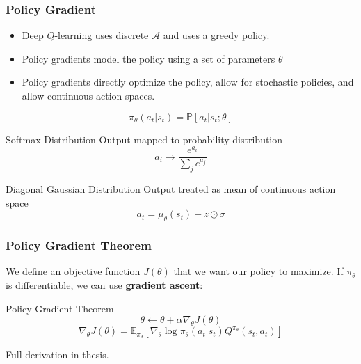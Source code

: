 \documentclass{beamer}
\begin{document}
\begin{frame}
  \frametitle{Policy Gradient}
  \begin{itemize}
    \item Deep $Q$-learning uses discrete $\mathcal{A}$ and uses a greedy policy.
    \item Policy gradients model the policy using a set of parameters $\theta$
    \item Policy gradients directly optimize the policy, allow for stochastic policies, and allow continuous action spaces.
  \end{itemize}
  \begin{equation}
    \pi_\theta (a_t \vert s_t) = \mathbb{P} \left[a_t \vert s_t; \theta \right]
  \end{equation}
  \begin{block}{Softmax Distribution}
    Output mapped to probability distribution
    \begin{equation*}
      a_i \to \frac{e^{a_i}}{\sum_j e^{a_j}}
    \end{equation*}
  \end{block}
  \begin{block}{Diagonal Gaussian Distribution}
    Output treated as mean of continuous action space
    \begin{equation*}
      a_t = \mu_\theta(s_t) + z \odot \sigma
    \end{equation*}
  \end{block}
\end{frame}
\begin{frame}
\frametitle{Policy Gradient Theorem}
  We define an objective function $J(\theta)$ that we want our policy to maximize. If $\pi_\theta$ is differentiable, we can use \textbf{gradient ascent}:
  \begin{exampleblock}{Policy Gradient Theorem}
    \begin{equation}
      \theta \gets \theta + \alpha \nabla_\theta J(\theta)
    \end{equation}
    \begin{equation*}
      \nabla_\theta J(\theta) = \mathbb{E}_{\pi_\theta} \left[ \nabla_\theta \log \pi_\theta (a_t \vert s_t) Q^{\pi_\theta}(s_t, a_t) \right]
    \end{equation*}
  \end{exampleblock}
  Full derivation in thesis.
\end{frame}
\end{document}

